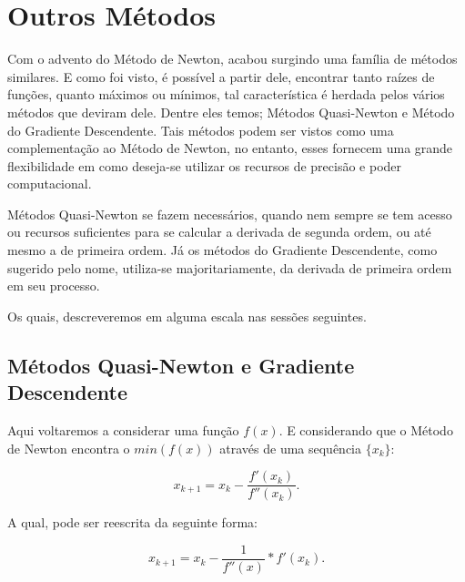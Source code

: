 \section{{Outros Métodos}}

\hspace{0.8cm}
Com o advento do Método de Newton, acabou surgindo uma família de métodos
similares. E como foi visto, é possível a partir dele, encontrar tanto raízes
de funções, quanto máximos ou mínimos, tal característica é herdada pelos vários
métodos que deviram dele. Dentre eles temos; Métodos Quasi-Newton e Método do
Gradiente Descendente. Tais métodos podem ser vistos como uma complementação ao
Método de Newton, no entanto, esses fornecem uma grande flexibilidade em
como deseja-se utilizar os recursos de precisão e poder computacional.

Métodos Quasi-Newton se fazem necessários, quando nem sempre se tem acesso ou
recursos suficientes para se calcular a derivada de segunda ordem, ou até mesmo
a de primeira ordem. Já os métodos do Gradiente Descendente, como sugerido pelo
nome, utiliza-se majoritariamente, da derivada de primeira ordem em seu
processo.

Os quais, descreveremos em alguma escala nas sessões seguintes.

\subsection{Métodos Quasi-Newton e Gradiente Descendente}

\hspace{0.8cm}
Aqui voltaremos a considerar uma função $f(x)$. E considerando que o Método
de Newton encontra o \(min(f(x))\) através de uma sequência \(\{x_k\}\):

\begin{equation}
    x_{k+1} = x_{k} - \frac {f'(x_{k})}{f''(x_{k})}.
\end{equation}

A qual, pode ser reescrita da seguinte forma:

\begin{equation}
    x_{k+1} = x_{k} -  \frac{1}{f''(x)} * f'(x_{k}).
\end{equation}

